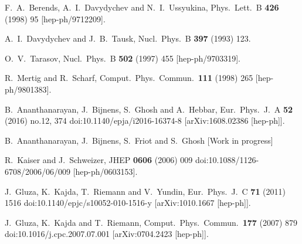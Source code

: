 \documentclass[12pt,a4paper]{article}
\begin{document}
\begin{thebibliography}{99}
  F.~A.~Berends, A.~I.~Davydychev and N.~I.~Ussyukina,
  Phys.\ Lett.\ B {\bf 426} (1998) 95
  [hep-ph/9712209].

  A.~I.~Davydychev and J.~B.~Tausk,
  Nucl.\ Phys.\ B {\bf 397} (1993) 123.
  
  O.~V.~Tarasov,
  Nucl.\ Phys.\ B {\bf 502} (1997) 455
  [hep-ph/9703319].
    
  R.~Mertig and R.~Scharf,
  Comput.\ Phys.\ Commun.\  {\bf 111} (1998) 265
  [hep-ph/9801383].

  B.~Ananthanarayan, J.~Bijnens, S.~Ghosh and A.~Hebbar,
  Eur.\ Phys.\ J.\ A {\bf 52} (2016) no.12,  374
  doi:10.1140/epja/i2016-16374-8
  [arXiv:1608.02386 [hep-ph]].

\cite{ABFG:2017}
	B.~Ananthanarayan, J.~Bijnens, S.~Friot and S.~Ghosh
	[Work in progress]

  R.~Kaiser and J.~Schweizer,
  JHEP {\bf 0606} (2006) 009
  doi:10.1088/1126-6708/2006/06/009
  [hep-ph/0603153].
  
  J.~Gluza, K.~Kajda, T.~Riemann and V.~Yundin,
  Eur.\ Phys.\ J.\ C {\bf 71} (2011) 1516
  doi:10.1140/epjc/s10052-010-1516-y
  [arXiv:1010.1667 [hep-ph]].

  J.~Gluza, K.~Kajda and T.~Riemann,
  Comput.\ Phys.\ Commun.\  {\bf 177} (2007) 879
  doi:10.1016/j.cpc.2007.07.001
  [arXiv:0704.2423 [hep-ph]].



\end{thebibliography}
\end{document}

